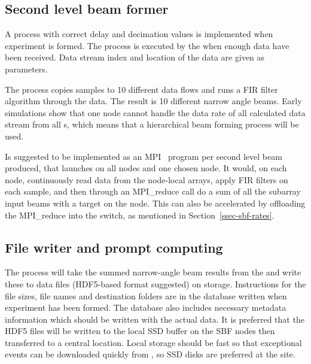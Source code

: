 \documentclass[12pt,a4paper]{article}
\begin{document}
\subsection{Second level beam former}

A \SBF process with correct delay and decimation values is implemented when experiment is formed. 
The \SBF process is executed by the \RB when enough data have been received. 
Data stream index and location of the data are given as parameters. 

The \SBF process copies samples to 10 different data flows and runs a FIR filter algorithm through the data. 
The result is 10 different narrow angle beams. 
Early simulations show that one node cannot handle the data rate of all calculated data stream from all \SA{}s, which means that a hierarchical beam forming process will be used. 

Is suggested to be implemented as an MPI~\cite{mpi} program per second level beam produced, that launches on all \RB nodes and one chosen \FW node. 
It would, on each \RB node, continuously read data from the node-local \RB arrays, apply FIR filters on each sample, and then through an MPI\_reduce call do a sum of all the subarray input beams with a target on the \FW node. 
This can also be accelerated by offloading the MPI\_reduce into the switch, as mentioned in Section~\ref{ssec-sbf-rates}.

% 
% 
% 
%

\subsection{File writer and prompt computing}
\label{ssec-fw-prompt}

The \FW process will take the summed narrow-angle beam results from the \SBF and write these to data files
(HDF5-based format suggested) on storage. 
Instructions for the file sizes, file names and destination folders are in the database written when experiment has been formed. 
The database also includes necessary metadata information which should be written with the actual data.
It is preferred that the HDF5 files will be written to the local SSD buffer on the SBF nodes then transferred to a central location. 
Local storage should be fast so that exceptional events can be downloaded quickly from \RB, so SSD disks are preferred at the site.
\end{document}
